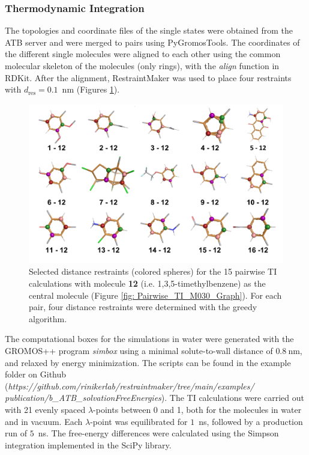 \subsubsection{Thermodynamic Integration}
The topologies and coordinate files of the single states were obtained from the ATB server\cite{Stroet2018} and were merged to pairs using PyGromosTools\cite{Lehner2021}. 
The coordinates of the different single molecules were aligned to each other using the common molecular skeleton of the molecules (only rings), with the \textit{align} function in RDKit\cite{Landrum2021}. After the alignment, RestraintMaker was used to place four restraints with $d_\text{res} = 0.1$~nm (Figures \ref{SIfig: Pairwise_TI_M030_Graph}). 

\begin{figure}[H]
    \centering
    \includegraphics[width=\textwidth]{fig/results/pairwise/restraintPlacement/Restraints_PairwiseTI_M030Graph.png}
    \caption{Selected distance restraints (colored spheres) for the 15 pairwise TI calculations with molecule \textbf{12} (i.e. 1,3,5-timethylbenzene) as the central molecule (Figure \ref{fig: Pairwise_TI_M030_Graph}). For each pair, four distance restraints were determined with the greedy algorithm.}
    \label{SIfig: Pairwise_TI_M030_Graph}
\end{figure}


The computational boxes for the simulations in water were generated with the GROMOS++ \cite{Eichenberger2011} program \textit{simbox} using a minimal solute-to-wall distance of $0.8~$nm, and relaxed by energy minimization. The scripts can be found in the example folder on Github (\textit{https://github.com/rinikerlab/restraintmaker/tree/main/examples/\\publication/b\_ATB\_solvationFreeEnergies}).
The TI calculations were carried out with 21 evenly spaced $\lambda$-points between 0 and 1, both for the molecules in water and in vacuum. Each $\lambda$-point was equilibrated for $1$~ns, followed by a production run of $5$~ns. The free-energy differences were calculated using the Simpson integration implemented in the SciPy library.\cite{Virtanen2020}

